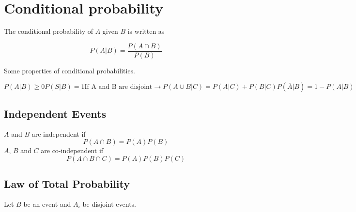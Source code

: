 \section{Conditional probability} %
\label{sec:conditional_probability}

The conditional probability of $A$ given $B$ is written as

\begin{equation}
  P(A|B) = \frac{P(A\cap B)}{P(B)}
\end{equation}

Some properties of conditional probabilities.

\begin{subequations}
  \begin{equation}
    P(A|B) \geq 0
  \end{equation}
  \begin{equation}
    P(S|B) = 1
  \end{equation}
  \begin{equation}
    \text{If A and B are disjoint} \rightarrow P(A \cup B|C) = P(A|C) + P(B|C)
  \end{equation}
  \begin{equation}
    P(\overline{A}|B) = 1 - P(A|B)
  \end{equation}
\end{subequations}


\subsection{Independent Events} %
\label{sub:independent_events}

$A$ and $B$ are independent if
\begin{equation}
  P(A\cap B) = P(A)P(B)
\end{equation}
$A$, $B$ and $C$ are co-independent if
\begin{equation}
  P(A\cap B\cap C) = P(A)P(B)P(C)
\end{equation}

\subsection{Law of Total Probability} %
\label{sub:law_of_total_probability}

Let $B$ be an event and $A_i$ be disjoint events.

